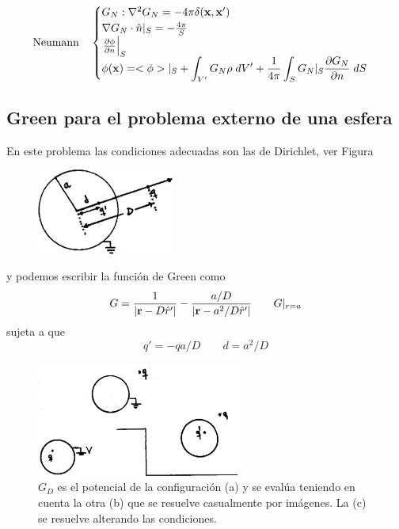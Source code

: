 \documentclass[10pt,oneside]{CBFT_book}
\begin{document}
\[
	\textrm{Neumann} \quad 	\begin{cases}
				G_N : \lapm{G_N} = -4\pi \delta(\vb{x},\vb{x}') \\
				\Nabla G_N \cdot \hat{n}|_S = -\frac{4\pi}{S}  \\
				\left.\dpar{\phi}{n}\right|_S \\
				\phi(\vb{x}) = \displaystyle <\phi>|_S + \int_{V'} G_N \rho \; dV' + 
				\frac{1}{4\pi} \int_{S} G_N|_S \dpar{G_N}{n} \; dS
			\end{cases}
\]

\subsection{Green para el problema externo de una esfera}

En este problema las condiciones adecuadas son las de Dirichlet, ver Figura
\begin{figure}[htb]
	\begin{center}
	\includegraphics[width=0.4\textwidth]{images/fig_ft1_green1.pdf}	 
	\end{center}
	\caption{}
\end{figure} 
y podemos escribir la función de Green como 
\[
	G = \frac{1}{|\vb{r} - D\hat{r}'|} - \frac{a/D}{|\vb{r} - a^2/D\hat{r}'|} \qquad G|_{r=a}
\]
sujeta a que 
\[
	q' = -q a/D \qquad d = a^2/D
\]
\begin{figure}[htb]
	\begin{center}
	\includegraphics[width=0.6\textwidth]{images/fig_ft1_green2.pdf}	 
	\end{center}
	\caption{$G_D$ es el potencial de la configuración (a) y se evalúa teniendo en cuenta la
	otra (b) que se resuelve casualmente por imágenes. La (c) se resuelve alterando las condiciones.}
\end{figure} 
\end{document}
